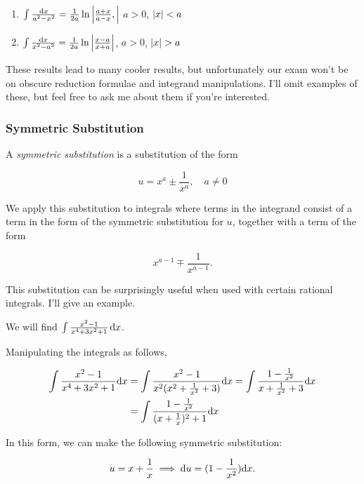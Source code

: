 \documentclass{article}
\begin{document}
{\begin{enumerate}
      \item \(\int \frac{\mathrm{d} x}{a^2 - x^2} = \frac{1}{2a}\ln\left\lvert \frac{a+x}{a-x},\right\rvert\) \hspace*{1cm} \(a > 0\), \(\left\lvert x\right\rvert < a\)
      
      \item \(\int \frac{\mathrm{d} x}{x^2 - a^2} = \frac{1}{2a} \ln\left\lvert \frac{x-a}{x+a}\right\rvert\), \hspace*{1cm} \(a > 0\), \(\left\lvert x\right\rvert > a\)
    \end{enumerate}

    These results lead to many cooler results, but unfortunately our exam won't be on obscure reduction formulae and integrand manipulations. I'll omit examples of these, but feel free to ask me about them if you're interested.

    \subsubsection*{Symmetric Substitution}
    A \emph{symmetric substitution} is a substitution of the form 

    \[
      u = x^a \pm \frac{1}{x^a}, \quad a \neq 0
    \]

    We apply this substitution to integrals where terms in the integrand consist of a term in the form of the symmetric substitution for \(u\), together with a term of the form 

    \[
      x^{a-1}  \mp \frac{1}{x^{a-1}}.
    \]

    This substitution can be surprisingly useful when used with certain rational integrals. I'll give an example.

    \begin{eg}
      We will find \(\int \frac{x^2-1}{x^4 + 3x^2 + 1} \, \mathrm{d} x\). 
      \vspace*{0.5cm}

      Manipulating the integrals as follows,

      \begin{align*}
        \int \frac{x^2-1}{x^4+3x^2+1} \mathrm{d} x &= \int \frac{x^2-1}{x^2(x^2 + \frac{1}{x^2}+3)} \mathrm{d} x = \int \frac{1 - \frac{1}{x^2}}{x+\frac{1}{x^2} + 3} \mathrm{d} x \\ 
        &= \int \frac{1 - \frac{1}{x^2}}{(x+\frac{1}{x})^2 + 1} \mathrm{d} x
      \end{align*}

      In this form, we can make the following symmetric substitution:

      \[
        u = x + \frac{1}{x} \implies \mathrm{d} u = (1 - \frac{1}{x^2}) \mathrm{d} x.
      \]


\end{eg}}
\end{document}
